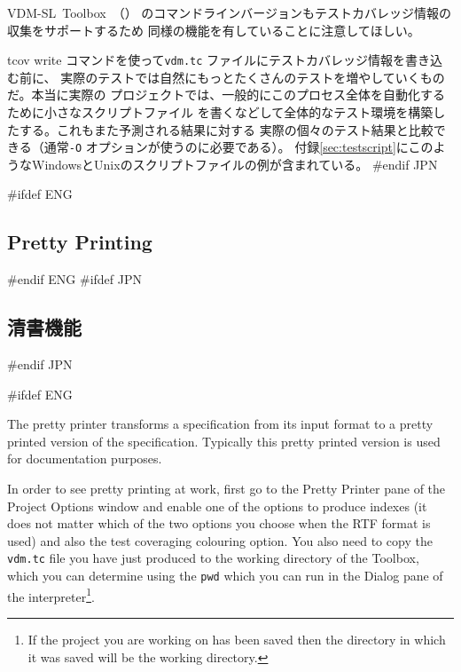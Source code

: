 \documentclass[\pformat,12pt]{article}
\newcommand{\vdmslpp}{VDM-SL}
\newcommand{\Toolbox}{Toolbox}
\newcommand{\vdmslpp}{VDM++}
\newcommand{\Toolbox}{Toolbox}
\newcommand{\guicmd}[1]{{\sf #1}}
\newcommand{\guicmd}[1]{{\gt #1}}
\begin{document}
\vdmslpp\ \Toolbox\ （）
のコマンドラインバージョンもテストカバレッジ情報の収集をサポートするため
同様の機能を有していることに注意してほしい。

\guicmd{tcov write} コマンドを使って\texttt{vdm.tc} ファイルにテストカバレッジ情報を書き込む前に、
実際のテストでは自然にもっとたくさんのテストを増やしていくものだ。本当に実際の
プロジェクトでは、一般的にこのプロセス全体を自動化するために小さなスクリプトファイル
を書くなどして全体的なテスト環境を構築したする。これもまた予測される結果に対する
実際の個々のテスト結果と比較できる（通常{\tt -O} オプションが使うのに必要である）。
付録\ref{sec:testscript}にこのようなWindowsとUnixのスクリプトファイルの例が含まれている。
#endif JPN

#ifdef ENG
\subsection{Pretty Printing}\label{subsec:pp}
#endif ENG
#ifdef JPN
\subsection{清書機能}\label{subsec:pp}
#endif JPN

#ifdef ENG

The pretty printer transforms a specification from its input format to
a pretty printed version of the specification. Typically this pretty
printed version is used for documentation purposes.

In order to see pretty printing at work, first go to the \guicmd{Pretty
Printer} pane of the \guicmd{Project Options} window and enable one of the
options to produce indexes (it does not matter which of the 
two options you choose when the RTF format is used) and also the test
coveraging colouring option. You also need to copy the {\tt vdm.tc}
file you have just produced to the working directory of the
\Toolbox, which you can determine using the {\tt pwd}
which you can run in the \guicmd{Dialog} pane of the
interpreter\footnote{If the project you are working on has been saved
  then the directory in which it was saved will be the working
  directory.}.
\end{document}
